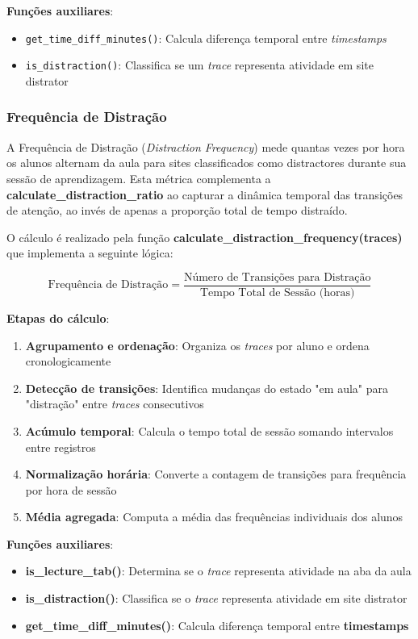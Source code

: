 \textbf{Funções auxiliares}:
\begin{itemize}
    \item \texttt{get\_time\_diff\_minutes()}: Calcula diferença temporal entre \textit{timestamps}
    \item \texttt{is\_distraction()}: Classifica se um \textit{trace} representa atividade em site distrator
\end{itemize}

\subsubsection{Frequência de Distração}

A Frequência de Distração (\textit{Distraction Frequency}) mede quantas vezes por hora os alunos alternam da aula para sites classificados como distractores durante sua sessão de aprendizagem. Esta métrica complementa a \textbf{calculate\_distraction\_ratio} ao capturar a dinâmica temporal das transições de atenção, ao invés de apenas a proporção total de tempo distraído.

O cálculo é realizado pela função \textbf{calculate\_distraction\_frequency(traces)} que implementa a seguinte lógica:

\begin{equation}
\text{Frequência de Distração} = \frac{\text{Número de Transições para Distração}}{\text{Tempo Total de Sessão (horas)}}
\end{equation}

% 

\textbf{Etapas do cálculo}:
\begin{enumerate}
    \item \textbf{Agrupamento e ordenação}: Organiza os \textit{traces} por aluno e ordena cronologicamente
    \item \textbf{Detecção de transições}: Identifica mudanças do estado "em aula" para "distração" entre \textit{traces} consecutivos
    \item \textbf{Acúmulo temporal}: Calcula o tempo total de sessão somando intervalos entre registros
    \item \textbf{Normalização horária}: Converte a contagem de transições para frequência por hora de sessão
    \item \textbf{Média agregada}: Computa a média das frequências individuais dos alunos
\end{enumerate}

\textbf{Funções auxiliares}:
\begin{itemize}
    \item \textbf{is\_lecture\_tab()}: Determina se o \textit{trace} representa atividade na aba da aula
    \item \textbf{is\_distraction()}: Classifica se o \textit{trace} representa atividade em site distrator
    \item \textbf{get\_time\_diff\_minutes()}: Calcula diferença temporal entre \textbf{timestamps}
\end{itemize}